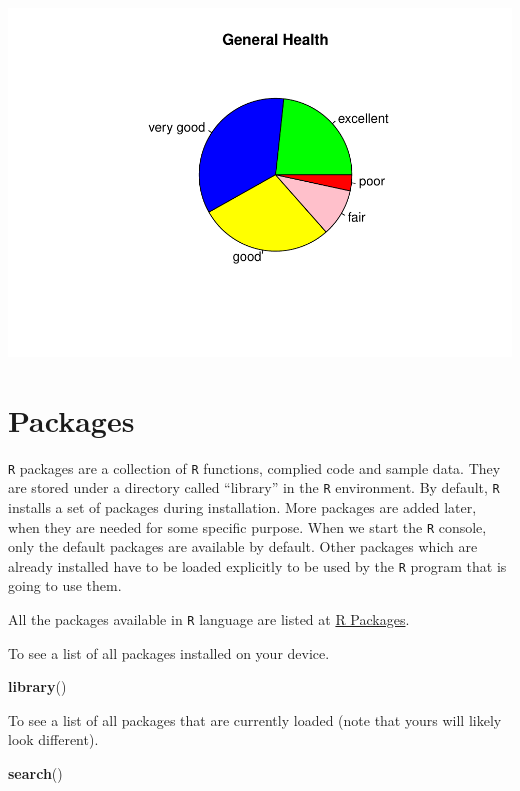 \documentclass[
]{book}
\newenvironment{Shaded}{\begin{snugshade}}{\end{snugshade}}
\newcommand{\KeywordTok}[1]{\textcolor[rgb]{0.13,0.29,0.53}{\textbf{#1}}}
\newcommand{\NormalTok}[1]{#1}
\begin{document}
\includegraphics{_main_files/figure-latex/unnamed-chunk-142-1.pdf}

\hypertarget{packages}{%
\chapter{Packages}\label{packages}}

\texttt{R} packages are a collection of \texttt{R} functions, complied code and sample data. They are stored under a directory called ``library'' in the \texttt{R} environment. By default, \texttt{R} installs a set of packages during installation. More packages are added later, when they are needed for some specific purpose. When we start the \texttt{R} console, only the default packages are available by default. Other packages which are already installed have to be loaded explicitly to be used by the \texttt{R} program that is going to use them.

All the packages available in \texttt{R} language are listed at \href{https://cran.r-project.org/web/packages/available_packages_by_name.html}{R Packages}.

To see a list of all packages installed on your device.

\begin{Shaded}
\begin{Highlighting}[]
\KeywordTok{library}\NormalTok{()}
\end{Highlighting}
\end{Shaded}

To see a list of all packages that are currently loaded (note that yours will likely look different).

\begin{Shaded}
\begin{Highlighting}[]
\KeywordTok{search}\NormalTok{()}
\end{Highlighting}
\end{Shaded}
\end{document}
